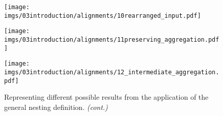 \begin{figure}[!ph]
\centering
\begin{minipage}[t]{0.9\textwidth}
	\centering
	\texttt{[image: imgs/03introduction/alignments/10rearranged\_input.pdf]}
	\label{fig:nestingexamples}
\end{minipage}
\begin{minipage}[t]{0.9\textwidth}
	\centering
	\texttt{[image: imgs/03introduction/alignments/11preserving\_aggregation.pdf]}
	\label{fig:firstexample}
\end{minipage}
\begin{minipage}[t]{0.9\textwidth}
	\centering
	\texttt{[image: imgs/03introduction/alignments/12\_intermediate\_aggregation.pdf]}
	\label{fig:secondexample}
\end{minipage}
\caption{Representing different possible results from the application of the general nesting definition. \textit{(cont.)}}
\label{fig:nestingoperations}
\end{figure}


